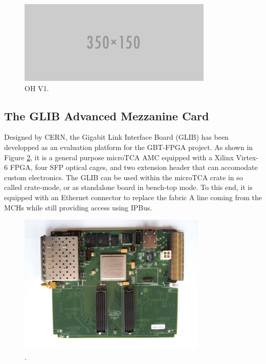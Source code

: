       \begin{figure}[h!]
        \centering
        \includegraphics[width=\textwidth]{img/empty.png}
        \caption{OH V1.}
        \label{fig:II-2-daq-ohv1}
      \end{figure}

    \subsection{The GLIB Advanced Mezzanine Card}

      Designed by CERN, the Gigabit Link Interface Board (GLIB) \cite{Vichoudis:1359270} has been developped as an evaluation platform for the GBT-FPGA project. As shown in Figure \ref{fig:II-2-daq-glib}, it is a general purpose microTCA AMC equipped with a Xilinx Virtex-6 FPGA, four SFP optical cages, and two extension header that can accomodate custom electronics. The GLIB can be used within the microTCA crate in so called crate-mode, or as standalone board in bench-top mode. To this end, it is equipped with an Ethernet connector to replace the fabric A line coming from the MCHs while still providing access using IPBus. \\

      \begin{figure}[h!]
        \centering
        \includegraphics[width=0.8\textwidth]{img/II-2-daq/glib.jpg}
        \caption{\cite{Vichoudis:1359270}.}
        \label{fig:II-2-daq-glib}
      \end{figure}

